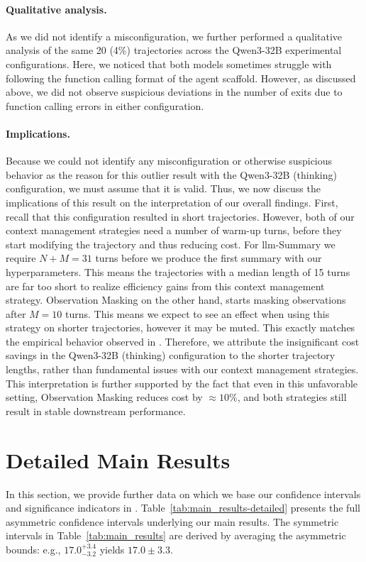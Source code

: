 \documentclass{article}
\begin{document}
\paragraph{Qualitative analysis.} As we did not identify a misconfiguration, we further performed a qualitative analysis of the same 20 (4\%) trajectories across the Qwen3-32B experimental configurations. Here, we noticed that both models sometimes struggle with following the function calling format of the agent scaffold. However, as discussed above, we did not observe suspicious deviations in the number of exits due to function calling errors in either configuration.

\paragraph{Implications.} Because we could not identify any misconfiguration or otherwise suspicious behavior as the reason for this outlier result with the Qwen3-32B (thinking) configuration, we must assume that it is valid. Thus, we now discuss the implications of this result on the interpretation of our overall findings. First, recall that this configuration resulted in short trajectories. However, both of our context management strategies need a number of warm-up turns, before they start modifying the trajectory and thus reducing cost. For \ac{llm}-Summary we require $N+M=31$ turns before we produce the first summary with our hyperparameters. This means the trajectories with a median length of 15 turns are far too short to realize efficiency gains from this context management strategy. Observation Masking on the other hand, starts masking observations after $M=10$ turns. This means we expect to see an effect when using this strategy on shorter trajectories, however it may be muted. This exactly matches the empirical behavior observed in . Therefore, we attribute the insignificant cost savings in the Qwen3-32B (thinking) configuration to the shorter trajectory lengths, rather than fundamental issues with our context management strategies. This interpretation is further supported by the fact that even in this unfavorable setting, Observation Masking reduces cost by $\approx10\%$, and both strategies still result in stable downstream performance.

\section{Detailed Main Results}
\label{appendix:main-resutlts-details}
In this section, we provide further data on which we base our confidence intervals and significance indicators in . Table~\ref{tab:main_results-detailed} presents the full asymmetric confidence intervals underlying our main results. The symmetric intervals in Table~\ref{tab:main_results} are derived by averaging the asymmetric bounds: e.g., $17.0_{-3.2}^{+3.4}$ yields $17.0 \pm 3.3$.
\end{document}
